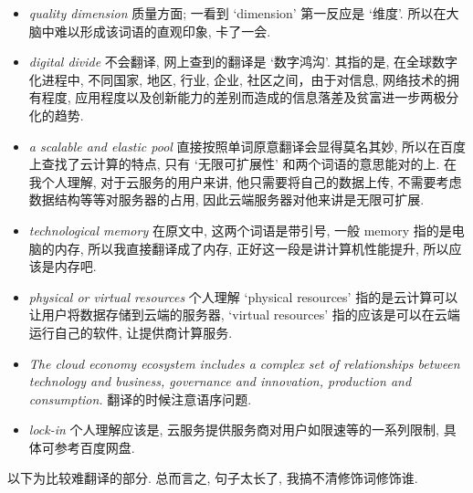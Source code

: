 \documentclass[a4paper, UTF8, 12pt]{article}
\begin{document}
\begin{itemize}
    \item \emph{quality dimension} 质量方面; 一看到 `dimension' 第一反应是 `维度'. 所以在大脑中难以形成该词语的直观印象, 卡了一会.
    \item \emph{digital divide} 不会翻译, 网上查到的翻译是 `数字鸿沟'. 其指的是, 在全球数字化进程中, 不同国家, 地区, 行业, 企业, 社区之间，由于对信息, 网络技术的拥有程度, 应用程度以及创新能力的差别而造成的信息落差及贫富进一步两极分化的趋势.
    \item \emph{a scalable and elastic pool} 直接按照单词原意翻译会显得莫名其妙, 所以在百度上查找了云计算的特点, 只有 `无限可扩展性' 和两个词语的意思能对的上. 在我个人理解, 对于云服务的用户来讲, 他只需要将自己的数据上传, 不需要考虑数据结构等等对服务器的占用, 因此云端服务器对他来讲是无限可扩展.
    \item \emph{technological memory} 在原文中, 这两个词语是带引号, 一般 memory 指的是电脑的内存, 所以我直接翻译成了内存, 正好这一段是讲计算机性能提升, 所以应该是内存吧.
    \item \emph{physical or virtual resources} 个人理解 `physical resources' 指的是云计算可以让用户将数据存储到云端的服务器, `virtual resources' 指的应该是可以在云端运行自己的软件, 让提供商计算服务.
    \item \emph{The cloud economy ecosystem includes a complex set of relationships between technology and business, governance and innovation, production and consumption.} 翻译的时候注意语序问题.
    \item \emph{lock-in} 个人理解应该是, 云服务提供服务商对用户如限速等的一系列限制, 具体可参考百度网盘.
\end{itemize}

以下为比较难翻译的部分. 总而言之, 句子太长了, 我搞不清修饰词修饰谁.
\end{document}
